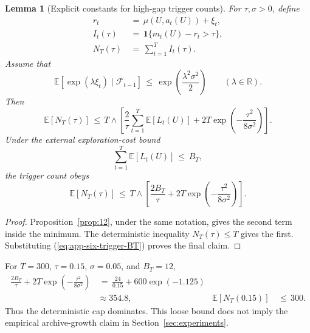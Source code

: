 \documentclass{article} %
\newtheorem{lemma}[theorem]{Lemma}
\renewcommand{\eqref}[1]{\textup{(\ref{#1})}}
\begin{document}
\begin{lemma}[Explicit constants for high-gap trigger counts]
\label{lem:17}
For \(\tau,\sigma>0\), define
\begin{align}
\label{eq:app-six-trigger-reward}
r_t
&\,=\,
\mu(U,a_t(U))+\xi_t,
\\
\label{eq:app-six-trigger-indicator}
I_t(\tau)
&\,=\,
\mathbf{1}\{m_t(U)-r_t>\tau\},
\\
\label{eq:app-six-trigger-count}
N_T(\tau)
&\,=\,
\sum_{t=1}^{T}I_t(\tau).
\end{align}
Assume that
\begin{equation}
\label{eq:app-six-trigger-subg}
\mathbb{E}\!\left[\exp(\lambda \xi_t)\mid \mathcal{F}_{t-1}\right]
\,\le\,
\exp\!\left(\frac{\lambda^2\sigma^2}{2}\right)
\qquad(\lambda\in\mathbb R).
\end{equation}
Then
\begin{equation}
\label{eq:app-six-trigger-bound}
\mathbb{E}[N_T(\tau)]
\,\le\,
T
\wedge
\left[
\frac{2}{\tau}\sum_{t=1}^{T}\mathbb{E}[L_t(U)]
+
2T\exp\!\left(-\frac{\tau^2}{8\sigma^2}\right)
\right].
\end{equation}
Under the external exploration-cost bound
\begin{equation}
\label{eq:app-six-trigger-BT}
\sum_{t=1}^{T}\mathbb{E}[L_t(U)]\,\le\, B_T,
\end{equation}
the trigger count obeys
\begin{equation}
\label{eq:app-six-trigger-BT-bound}
\mathbb{E}[N_T(\tau)]
\,\le\,
T
\wedge
\left[
\frac{2B_T}{\tau}
+
2T\exp\!\left(-\frac{\tau^2}{8\sigma^2}\right)
\right].
\end{equation}
\end{lemma}

\begin{proof}
Proposition~\ref{prop:12}, under the same notation, gives the second term
inside the minimum. The deterministic inequality \(N_T(\tau)\leq T\) gives
the first. Substituting \eqref{eq:app-six-trigger-BT} proves the final claim.
\end{proof}

For \(T=300\), \(\tau=0.15\), \(\sigma=0.05\), and \(B_T=12\),
\begin{equation}
\begin{aligned}
\frac{2B_T}{\tau}
+
2T\exp\!\left(-\frac{\tau^2}{8\sigma^2}\right)
&\,=\,
\frac{24}{0.15}
+
600\exp(-1.125)
\\
&\approx
354.8,
&
\mathbb E[N_T(0.15)]
&\,\leq\,300.
\end{aligned}
\end{equation}
Thus the deterministic cap dominates. This loose bound does not imply the
empirical archive-growth claim in Section~\ref{sec:experiments}.
\end{document}
